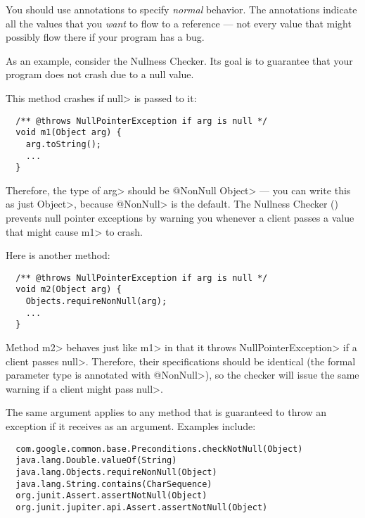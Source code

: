 
You should use annotations to specify \emph{normal} behavior.  The
annotations indicate all the values that you \emph{want} to flow to a
reference --- not every value that might possibly flow there if your
program has a bug.



As an example, consider the Nullness Checker.  Its goal is to guarantee that your
program does not crash due to a null value.

This method crashes if \<null> is passed to it:

\begin{Verbatim}
  /** @throws NullPointerException if arg is null */
  void m1(Object arg) {
    arg.toString();
    ...
  }
\end{Verbatim}

\noindent
Therefore, the type of \<arg>
should be \<@NonNull Object> --- you can write this as just \<Object>, because
\<@NonNull> is the default.  The Nullness Checker ()
prevents null pointer exceptions by warning you whenever a client passes a
value that might cause \<m1> to crash.

Here is another method:

\begin{Verbatim}
  /** @throws NullPointerException if arg is null */
  void m2(Object arg) {
    Objects.requireNonNull(arg);
    ...
  }
\end{Verbatim}

Method \<m2> behaves just like \<m1> in that it throws
\<NullPointerException> if a client passes \<null>.  Therefore, their
specifications should be identical (the formal parameter type is annotated
with \<@NonNull>), so the
checker will issue the same warning if a client might pass \<null>.

The same argument applies to any method that is guaranteed to throw an exception
if it receives  as an argument.  Examples include:

\begin{Verbatim}
  com.google.common.base.Preconditions.checkNotNull(Object)
  java.lang.Double.valueOf(String)
  java.lang.Objects.requireNonNull(Object)
  java.lang.String.contains(CharSequence)
  org.junit.Assert.assertNotNull(Object)
  org.junit.jupiter.api.Assert.assertNotNull(Object)
\end{Verbatim}

